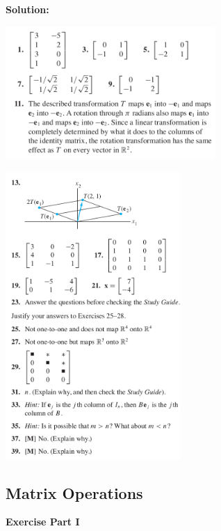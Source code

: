 \documentclass[a4paper,11pt,reqno]{amsart}
\numberwithin{equation}{section}
\begin{document}
\newpage

\textbf{Solution:}

\includegraphics[width=0.6\textwidth]{exercises/lt_ans1.png}

\includegraphics[width=0.5\textwidth]{exercises/lt_ans2.png}


\newpage

\subsection{Matrix Operations}
\textbf{Exercise Part I}
\end{document}
